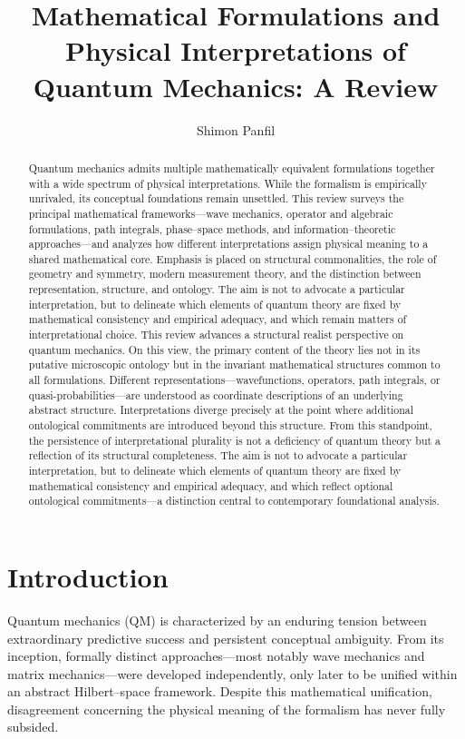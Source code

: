 \documentclass[11pt]{article}
\title{Mathematical Formulations and Physical Interpretations of Quantum Mechanics: A Review}
\author{Shimon Panfil}
\date{}
\begin{document}
\maketitle

\begin{abstract}
Quantum mechanics admits multiple mathematically equivalent formulations together with a wide spectrum of physical interpretations. While the formalism is empirically unrivaled, its conceptual foundations remain unsettled. This review surveys the principal mathematical frameworks—wave mechanics, operator and algebraic formulations, path integrals, phase--space methods, and information--theoretic approaches—and analyzes how different interpretations assign physical meaning to a shared mathematical core. Emphasis is placed on structural commonalities, the role of geometry and symmetry, modern measurement theory, and the distinction between representation, structure, and ontology. The aim is not to advocate a particular interpretation, but to delineate which elements of quantum theory are fixed by mathematical consistency and empirical adequacy, and which remain matters of interpretational choice.
This review advances a structural realist perspective on quantum mechanics. On this view, the primary content of the theory lies not in its putative microscopic ontology but in the invariant mathematical structures common to all formulations. Different representations—wavefunctions, operators, path integrals, or quasi-probabilities—are understood as coordinate descriptions of an underlying abstract structure. Interpretations diverge precisely at the point where additional ontological commitments are introduced beyond this structure. From this standpoint, the persistence of interpretational plurality is not a deficiency of quantum theory but a reflection of its structural completeness.
The aim is not to advocate a particular interpretation, but to delineate which elements of quantum theory are fixed by mathematical consistency and empirical adequacy, and which reflect optional ontological commitments—a distinction central to contemporary foundational analysis.

\end{abstract}

\tableofcontents

\section{Introduction}

Quantum mechanics (QM) is characterized by an enduring tension between extraordinary predictive success and persistent conceptual ambiguity. From its inception, formally distinct approaches—most notably wave mechanics and matrix mechanics—were developed independently, only later to be unified within an abstract Hilbert--space framework. Despite this mathematical unification, disagreement concerning the physical meaning of the formalism has never fully subsided.
\end{document}
